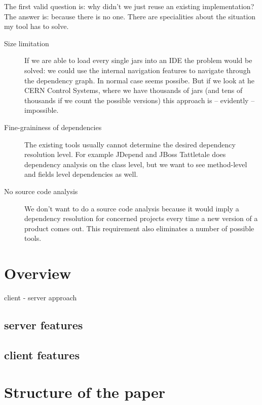 The first valid question is: why didn't we just reuse an existing
implementation? The answer is: because there is no one.
There are specialities about the situation my tool has to solve.
\begin{description}
\item[Size limitation] If we are able to load every single jars into an IDE the
problem would be solved: we could use the internal navigation features to navigate 
through the dependency graph. In normal case seems possibe. 
But if we look at he CERN Control Systems, where we have thousands of jars (and tens of 
thousands if we count the possible versions) this approach is -- evidently -- impossible.   
\item[Fine-graininess of dependencies] The existing tools usually cannot determine
the desired dependency resolution level. For example JDepend \cite{JDepend} and
JBoss Tattletale \cite{Tattletale} does dependency analysis on the class level,
but we want to see method-level and fields level dependencies as well.
\item[No source code analysis] We don't want to do a source code analysis because 
it would imply a dependency resolution for concerned projects every time a new version 
of a product comes out. This requirement also eliminates a number of possible tools. 
\end{description}



\section{Overview}

client - server approach

\subsection{server features}


\subsection{client features}


\section{Structure of the paper}



